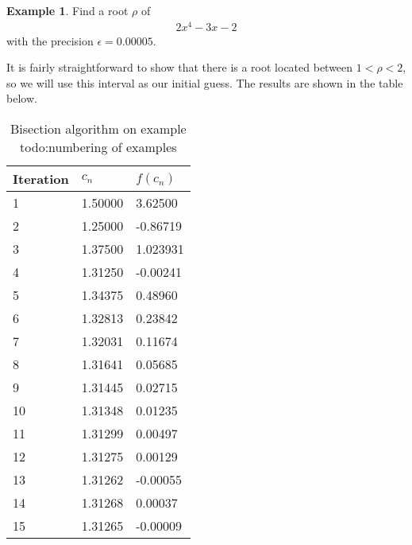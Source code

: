 \documentclass[
  digital, %
  table,   %
  nolof,     %
  nolot,     %
	draft, %
]{fithesis3}
\begin{document}
\theoremstyle{definition}
\newtheorem{example}{Example}[section]
\begin{example}
Find a root $\rho$ of 
\begin{align}
      2x^{4} - 3x - 2
\end{align}
with the precision $\epsilon = 0.00005$.
\end{example}
It is fairly straightforward to show that there is a root located between $1 < \rho < 2$, so we will use this interval as our initial guess. The results are shown in the table below.
\begin{table}
  \begin{tabularx}{\textwidth}{lll}
    \toprule
    Iteration & $c_{n}$ & $f(c_{n})$\\
    \midrule
    1 & 1.50000 & 3.62500 \\
    2 & 1.25000 & -0.86719 \\
    3 & 1.37500 & 1.023931 \\
    4 & 1.31250 & -0.00241 \\
    5 & 1.34375 & 0.48960 \\
    6 & 1.32813 & 0.23842 \\
    7 & 1.32031 & 0.11674 \\
    8 & 1.31641 & 0.05685 \\
    9 & 1.31445 & 0.02715 \\
    10 & 1.31348 & 0.01235 \\
    11 & 1.31299 & 0.00497 \\
    12 & 1.31275 & 0.00129 \\
    13 & 1.31262 & -0.00055 \\
    14 & 1.31268 & 0.00037 \\
    15 & 1.31265 & -0.00009 \\
    \bottomrule
  \end{tabularx}
  \caption{Bisection algorithm on example todo:numbering of examples}
  \label{tab:bis}
\end{table}
\end{document}

